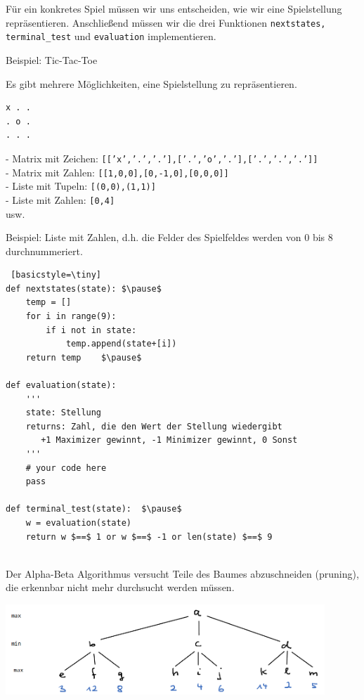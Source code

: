 \documentclass{beamer}
\begin{document}
\begin{frame}[fragile]
Für ein konkretes Spiel müssen wir uns entscheiden, wie wir eine Spielstellung repräsentieren. Anschließend müssen wir die drei Funktionen \texttt{nextstates, terminal\_test} und \texttt{evaluation} implementieren.

Beispiel: Tic-Tac-Toe

Es gibt mehrere Möglichkeiten, eine Spielstellung zu repräsentieren.
\begin{lstlisting} 
x . . 
. o . 
. . . 
\end{lstlisting}  \pause
- Matrix mit Zeichen: \texttt{[['x','.','.'],['.','o','.'],['.','.','.']]} \\
- Matrix mit Zahlen:   \texttt{[[1,0,0],[0,-1,0],[0,0,0]]} \\
- Liste mit Tupeln: \texttt{[(0,0),(1,1)]} \\
- Liste mit Zahlen: \texttt{[0,4]} \\
usw.

\end{frame}

\begin{frame}[fragile]
Beispiel: Liste mit Zahlen, d.h. die Felder des Spielfeldes werden von 0 bis 8 durchnummeriert.
\begin{lstlisting} [basicstyle=\tiny]
def nextstates(state): $\pause$
    temp = []
    for i in range(9):
        if i not in state:
            temp.append(state+[i])
    return temp    $\pause$

def evaluation(state): 
    '''
    state: Stellung
    returns: Zahl, die den Wert der Stellung wiedergibt
       +1 Maximizer gewinnt, -1 Minimizer gewinnt, 0 Sonst
    '''
    # your code here
    pass

def terminal_test(state):  $\pause$
    w = evaluation(state)
    return w $==$ 1 or w $==$ -1 or len(state) $==$ 9 


\end{lstlisting} 
\end{frame}



\begin{frame}[fragile]
Der Alpha-Beta Algorithmus versucht Teile des Baumes abzuschneiden (pruning), die erkennbar nicht mehr durchsucht werden müssen.

\includegraphics[width=12cm]{bild12.png} 
\end{frame}
\end{document}
